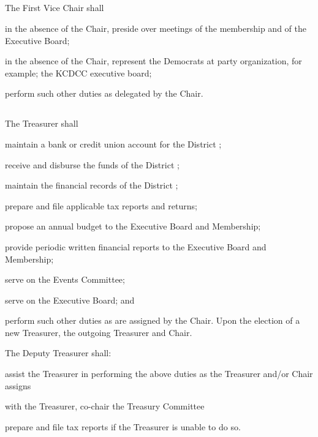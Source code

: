 \subsection{}
The First Vice Chair shall
\begin{inlinealphalist}
    \item in the absence of the Chair, preside over meetings of the membership and of the Executive Board;
    \item in the absence of the Chair, represent the \fortythird{}  Democrats at party organization, for example; the KCDCC executive board;
    \item perform such other duties as delegated by the Chair.
\end{inlinealphalist}

\subsection{}
The Treasurer shall
\begin{inlinealphalist}
    \item maintain a bank or credit union account for the \fortythird{} District ;
    \item receive and disburse the funds of the \fortythird{} District ;
    \item maintain the financial records of the \fortythird{} District ;
    \item prepare and file applicable tax reports and returns;
    \item propose an annual budget to the Executive Board and Membership;
    \item provide periodic written financial reports to the Executive Board and Membership;
    \item serve on the Events Committee;
    \item serve on the Executive Board; and
    \item perform such other duties as are assigned by the Chair. Upon the election of a new Treasurer, the outgoing Treasurer and Chair.
\end{inlinealphalist}

The Deputy Treasurer shall:
\begin{inlinealphalist}
    \item assist the Treasurer in performing the above duties as the Treasurer and/or Chair assigns
    \item with the Treasurer, co-chair the Treasury Committee
    \item prepare and file tax reports if the Treasurer is unable to do so.
\end{inlinealphalist}

